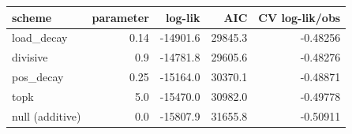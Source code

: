 \begin{tabular}{lrrrr}
\toprule
scheme & parameter & log-lik & AIC & CV log-lik/obs \\
\midrule
load\_decay & 0.14 & -14901.6 & 29845.3 & -0.48256 \\
divisive & 0.9 & -14781.8 & 29605.6 & -0.48276 \\
pos\_decay & 0.25 & -15164.0 & 30370.1 & -0.48871 \\
topk & 5.0 & -15470.0 & 30982.0 & -0.49778 \\
null (additive) & 0.0 & -15807.9 & 31655.8 & -0.50911 \\
\bottomrule
\end{tabular}